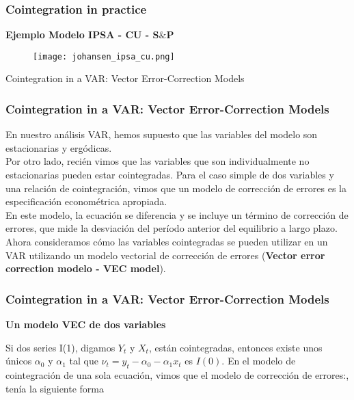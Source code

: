 \documentclass[spanish,xcolor=table]{beamer}
\begin{document}
\begin{frame}
\frametitle{Cointegration in practice}
\textbf{Ejemplo Modelo IPSA - CU - S$\&$P}

\begin{figure}[t!]
\texttt{[image: johansen\_ipsa\_cu.png]}

\end{figure}
\end{frame}

\begin{section}{Cointegration in a VAR: Vector Error-Correction Models}
\begin{frame}
\frametitle{Cointegration in a VAR: Vector Error-Correction Models}


En nuestro an\'alisis VAR, hemos supuesto que las variables del modelo son estacionarias y erg\'odicas. \\
Por otro lado, reci\'en vimos que las variables que son individualmente no estacionarias pueden estar cointegradas. Para el caso simple de dos variables y una relación de cointegraci\'on, vimos que un modelo de correcci\'on de errores es la especificaci\'on econom\'etrica apropiada. \\
\vspace{4mm}	
En este modelo, la ecuaci\'on se diferencia y se incluye un t\'ermino de correcci\'on de errores, que mide la desviaci\'on del per\'{i}odo anterior del equilibrio a largo plazo.\\
Ahora consideramos c\'omo las variables cointegradas se pueden utilizar en un VAR utilizando un modelo vectorial de correcci\'on de errores (\textbf{Vector error correction modelo - VEC model}). 

\end{frame}

\begin{frame}
\frametitle{Cointegration in a VAR: Vector Error-Correction Models}

\textbf{Un modelo VEC de dos variables}

Si dos series I(1), digamos $Y_t$ y $X_t$, est\'an cointegradas, entonces existe unos \'unicos $\alpha_0$ y $\alpha_1$ tal que $\nu_t = y_t - \alpha_0 - \alpha_1 x_t$ es $I(0)$. En el modelo de cointegraci\'on de una sola ecuaci\'on, vimos que el modelo de correcci\'on de errores:, ten\'{i}a la siguiente forma


\end{frame}
\end{section}
\end{document}
